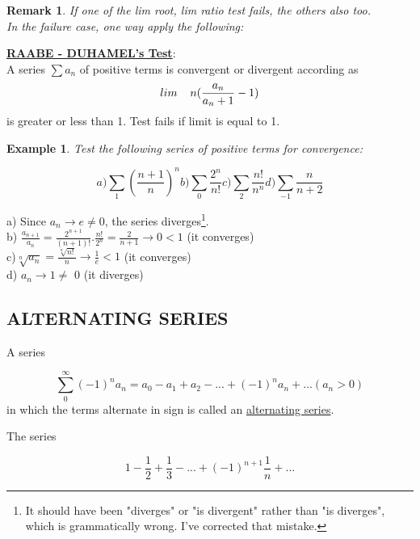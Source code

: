 \documentclass[11pt]{amsbook}
\newtheorem*{remark}{Remark}
\newtheorem{example}{Example}
\begin{document}
\begin{remark}
If one of the lim root, lim ratio test fails, the others also too. \\
In the failure case, one way apply the following:
\end{remark}
\textbf{\underline{RAABE - DUHAMEL's Test}}: \\
A series $\sum {a_n} $ of positive terms is convergent or divergent according as \\
\begin{equation}
lim \hspace{4mm} n(\frac{a_n}{a_n+1}-1) 
\end{equation}
is greater or less than 1. Test fails if limit is equal to 1. 
\begin{example}
Test the following series of positive terms for convergence:

	\[
    	a) \sum_{1}^{}(\frac{n+1}{n})^{n} b) \sum_{0}^{}\frac{2^n}{n!} c) \sum_{2}^{}\frac{n!}{n^n} d) \sum_{-1}^{}\frac{n}{n+2}
	\]
\end{example}
\begin{hSolution}
a) Since $a_n \rightarrow e \neq 0$, the series diverges\footnote{\label{1}It should have been "diverges" or "is divergent" rather than "is diverges", which is grammatically wrong. I've corrected that mistake.}. \\
b) $\frac{a_{n+1}}{a_n} = \frac{2^{n+1}}{(n+1)!} . \frac{n!}{2^n} = \frac{2}{n+1} \rightarrow 0 < 1$ (it converges) \\
c)$\sqrt[n]{a_n} = \frac{\sqrt[n]{n!}}{n} \rightarrow \frac{1}{e} < 1$ (it converges) \\
d) $a_n \rightarrow 1 \neq$ 0 (it diverges)  
\end{hSolution}

\subsection{ALTERNATING SERIES}
A series

	\[
		\sum_{0}^{\infty} (-1)^n a_n = a_0 - a_1 + a_2 - ... + (-1)^n a_n + ... (a_n > 0)
	\]
in which the terms alternate in sign is called an \underline{alternating series}.
\par The series
	
	\[
		1 - \frac{1}{2} + \frac{1}{3} - ... + (-1)^{n+1} \frac{1}{n} + ...
	\]
\end{document}

